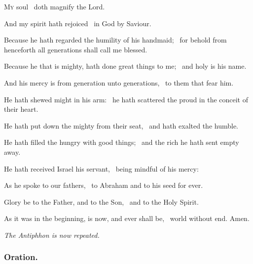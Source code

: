 \documentclass[12pt]{article} %
\newenvironment{psalmtext}{\leftskip 0.25in}{\vspace{2 mm}}
\newenvironment{rubric}{\vspace{2 mm}\color{benred8} \itshape \leftskip 0in \setlength{\parindent}{0.25in}}{\vspace{2 mm}}
\let\oldgresixstar\gresixstar
\renewcommand{\gresixstar}{\textcolor{benred8}{\oldgresixstar}}
\let\oldgrealtcross\grealtcross
\renewcommand{\grealtcross}{\textcolor{benred8}{\oldgrealtcross}}
\begin{document}
\begin{pages}
\begin{Rightside}
\begin{rubric}
\end{rubric}

\pend\pstart

\begin{psalmtext}
\lettrine[lhang=0.70]{M}{y} soul \grealtcross\ doth magnify the Lord.

\hspace*{9.5 mm}And my spirit hath rejoiced \gresixstar\ in God by Saviour.

Because he hath regarded the humility of his handmaid; \gresixstar\ for behold from henceforth all generations shall call me blessed.

Because he that is mighty, hath done great things to me; \gresixstar\ and holy is his name.

And his mercy is from generation unto generations, \gresixstar\ to them that fear him.

He hath shewed might in his arm: \gresixstar\ he hath scattered the proud in the conceit of their heart.

He hath put down the mighty from their seat, \gresixstar\ and hath exalted the humble.

He hath filled the hungry with good things; \gresixstar\ and the rich he hath sent empty away.

He hath received Israel his servant, \gresixstar\ being mindful of his mercy:

As he spoke to our fathers, \gresixstar\ to Abraham and to his seed for ever.

Glory be to the Father, and to the Son, \gresixstar\ and to the Holy Spirit.

As it was in the beginning, is now, and ever shall be, \gresixstar\ world without end. Amen.

\end{psalmtext}

\pend\pstart

\begin{rubric}
The Antiphhon is now repeated.

\end{rubric}

\pend\pstart

\subsubsection*{Oration.}

\pend\pstart



\end{Rightside}
\end{pages}
\end{document}

